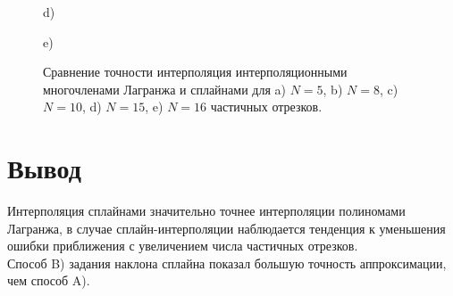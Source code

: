 \documentclass[
11pt,
master, %
subf, %
href, %
colorlinks=true, %
times, %
]{disser}
\begin{document}
\begin{figure}[h]
\begin{minipage}[h]{0.48\linewidth}
\end{minipage}
\hfill
\begin{minipage}[h]{0.48\linewidth}
 d)
\end{minipage}
\vfill
\begin{minipage}[h]{\linewidth}
 e)
\end{minipage}
\caption{Сравнение точности интерполяция интерполяционными многочленами Лагранжа и сплайнами для a) $N=5$, b) $N=8$, c) $N=10$, d) $N=15$, e) $N=16$ частичных отрезков.}
\label{ris:4}
\end{figure}

\newpage
\section{Вывод}
Интерполяция сплайнами значительно точнее интерполяции полиномами Лагранжа, в случае сплайн-интерполяции наблюдается тенденция к уменьшения ошибки приближения с увеличением числа частичных отрезков.\\ Способ B) задания наклона сплайна показал большую точность аппроксимации, чем способ A).
\end{document}
